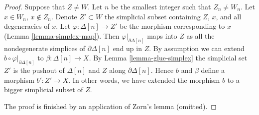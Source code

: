 \documentclass{stacks-project}
\theoremstyle{plain}
\theoremstyle{definition}
\theoremstyle{remark}
\numberwithin{equation}{subsection}
\begin{document}
\begin{proof}
Suppose that $Z \not = W$. Let $n$ be the smallest integer such that
$Z_n \not = W_n$. Let $x \in W_n$, $x \not \in Z_n$. Denote
$Z' \subset W$ the simplicial subset containing $Z$, $x$, and
all degeneracies of $x$. Let
$\varphi : \Delta[n] \to Z'$ be the morphism corresponding to $x$
(Lemma \ref{lemma-simplex-map}).
Then $\varphi|_{\partial \Delta[n]}$ maps into $Z$
as all the nondegenerate simplices of $\partial \Delta[n]$ end up in $Z$.
By assumption we can extend $b \circ \varphi|_{\partial \Delta[n]}$
to $\beta : \Delta[n] \to X$.
By Lemma \ref{lemma-glue-simplex} the simplicial set $Z'$
is the pushout of $\Delta[n]$ and $Z$ along $\partial \Delta[n]$.
Hence $b$ and $\beta$ define a morphism $b' : Z' \to X$.
In other words, we have extended the morphism $b$ to a bigger
simplicial subset of $Z$.

\medskip\noindent
The proof is finished by an application of Zorn's lemma (omitted).
\end{proof}
\end{document}
